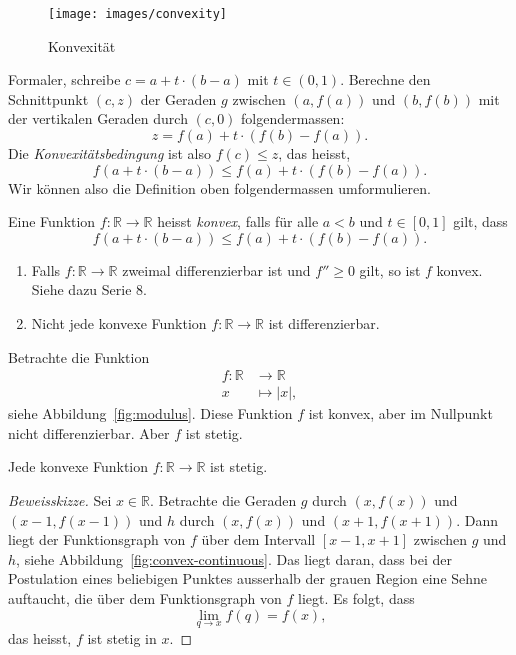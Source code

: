 \documentclass[../main.tex]{subfiles}
\begin{document}
\begin{figure}[htb]
  \centering
  \texttt{[image: images/convexity]}
  \caption{Konvexität}%
  \label{fig:convexity}
\end{figure}

Formaler, schreibe
$
  c = a + t \cdot (b-a)
  $
mit $t \in (0, 1)$.
Berechne den Schnittpunkt $(c, z)$ der
Geraden $g$ zwischen
$(a, f(a))$ und $(b, f(b))$
mit der vertikalen Geraden durch $(c, 0)$
folgendermassen:
\[
  z = f(a) + t \cdot (f(b) - f(a)).
\]
Die \emph{Konvexitätsbedingung} ist also
$f(c) \leq z$, das heisst,
\[
  f(a + t \cdot (b-a)) \leq f(a) + t\cdot (f(b) - f(a)).
\]
Wir können also die Definition oben folgendermassen
umformulieren.

\begin{definition}
  Eine Funktion $f \colon \mathbb{R} \to \mathbb{R}$
  heisst \emph{konvex}, falls für alle $a < b$
  und $t \in [0, 1]$ gilt, dass
  \[
    f(a + t \cdot (b - a)) \leq f(a) + t\cdot (f(b) - f(a)).
  \]
\end{definition}

\newpage
\begin{remarks}
  \leavevmode
  \begin{enumerate}[(1)]
    \item Falls $f \colon \mathbb{R} \to \mathbb{R}$
      zweimal differenzierbar ist und $f'' \geq 0$ gilt,
      so ist $f$ konvex. Siehe dazu Serie 8.
    \item Nicht jede konvexe Funktion
      $f \colon \mathbb{R} \to \mathbb{R}$ ist
      differenzierbar.
  \end{enumerate}
\end{remarks}

\begin{example}
  Betrachte die Funktion
  \begin{align*}
    f \colon \mathbb{R} & \to \mathbb{R} \\
    x & \mapsto |x|,
  \end{align*}
  siehe Abbildung~\ref{fig:modulus}.
  Diese Funktion $f$ ist konvex, aber im
  Nullpunkt nicht differenzierbar.
  Aber $f$ ist stetig.
\end{example}

\begin{claim}
  Jede konvexe Funktion $f \colon \mathbb{R} \to \mathbb{R}$
  ist stetig.
\end{claim}

\begin{proof}[Beweisskizze]
  Sei $x \in \mathbb{R}$.
  Betrachte die Geraden $g$
  durch $(x, f(x))$ und $(x-1, f(x-1))$
  und $h$ durch $(x, f(x))$ und $(x+  1, f(x+1))$.
  Dann liegt der Funktionsgraph von $f$
  über dem Intervall $[x-1, x+1]$ zwischen
  $g$ und $h$, siehe Abbildung~\ref{fig:convex-continuous}.
  Das liegt daran, dass bei der Postulation
  eines beliebigen Punktes ausserhalb
  der grauen Region eine Sehne auftaucht,
  die über dem Funktionsgraph von $f$ liegt.
  Es folgt, dass
  \[
    \lim_{q \to x} f(q) = f(x),
  \]
  das heisst, $f$ ist stetig in $x$.
\end{proof}
\end{document}
